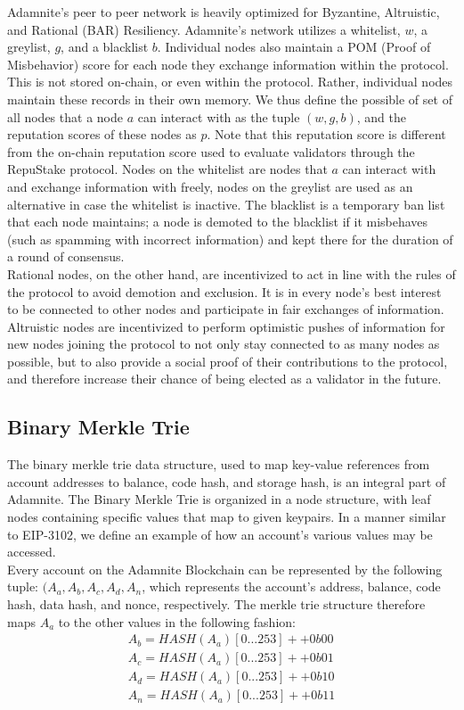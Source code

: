 \documentclass[conference]{IEEEtran}
\begin{document}
Adamnite's peer to peer network is heavily optimized for Byzantine, Altruistic, and Rational (BAR) Resiliency. Adamnite's network utilizes a whitelist, $w$, a greylist, $g$, and a blacklist $b$. Individual nodes also maintain a POM (Proof of Misbehavior) score for each node they exchange information within the protocol. This is not stored on-chain, or even within the protocol. Rather, individual nodes maintain these records in their own memory. We thus define the possible of set of all nodes that a node $a$ can interact with as the tuple $(w,g,b)$, and the reputation scores of these nodes as $p$. Note that this reputation score is different from the on-chain reputation score used to evaluate validators through the RepuStake protocol. Nodes on the whitelist are nodes that $a$ can interact with and exchange information with freely, nodes on the greylist are used as an alternative in case the whitelist is inactive. The blacklist is a temporary ban list that each node maintains; a node is demoted to the blacklist if it misbehaves (such as spamming with incorrect information) and kept there for the duration of a round of consensus.\\

Rational nodes, on the other hand, are incentivized to act in line with the rules of the protocol to avoid demotion and exclusion. It is in every node's best interest to be connected to other nodes and participate in fair exchanges of information. Altruistic nodes are incentivized to perform optimistic pushes of information for new nodes joining the protocol to not only stay connected to as many nodes as possible, but to also provide a social proof of their contributions to the protocol, and therefore increase their chance of being elected as a validator in the future.

\subsection{Binary Merkle Trie}

The binary merkle trie data structure, used to map key-value references from account addresses to balance, code hash, and storage hash, is an integral part of Adamnite. The Binary Merkle Trie is organized in a node structure, with leaf nodes containing specific values that map to given keypairs. In a manner similar to EIP-3102, we define an example of how an account's various values may be accessed.\\

Every account on the Adamnite Blockchain can be represented by the following tuple: $(A_a, A_b, A_c, A_d, A_n$, which represents the account's address, balance, code hash, data hash, and nonce, respectively. The merkle trie structure therefore maps $A_a$ to the other values in the following fashion:
\begin{eqnarray}
A_b = HASH(A_a)[0...253] ++ 0b00\\
A_c = HASH(A_a)[0...253] ++ 0b01\\
A_d = HASH(A_a)[0...253] ++ 0b10\\
A_n = HASH(A_a)[0...253] ++ 0b11\\
\end{eqnarray}
\end{document}
